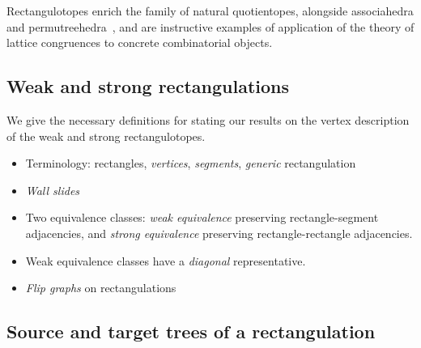 \documentclass{amsart}
\theoremstyle{definition}
\newcommand{\darkblue}{\color{darkblue}} %
\newcommand{\defn}[1]{\textsl{\darkblue #1}} %
\begin{document}
Rectangulotopes enrich the family of natural quotientopes, alongside associahedra and permutreehedra~\cite{MR3856522}, and are instructive examples of application of the theory of lattice congruences to concrete combinatorial objects.


\subsection{Weak and strong rectangulations}

We give the necessary definitions for stating our results on the vertex description of the weak and strong rectangulotopes.

\begin{itemize}
\item Terminology: rectangles, \defn{vertices}, \defn{segments}, \defn{generic} rectangulation
\item \defn{Wall slides}
\item Two equivalence classes: \defn{weak equivalence} preserving rectangle-segment adjacencies, and \defn{strong equivalence} preserving rectangle-rectangle adjacencies.
\item Weak equivalence classes have a \defn{diagonal} representative.
\item \defn{Flip graphs} on rectangulations
\end{itemize}


\subsection{Source and target trees of a rectangulation}
\label{subsec:sourceTargetTrees}

\end{document}

